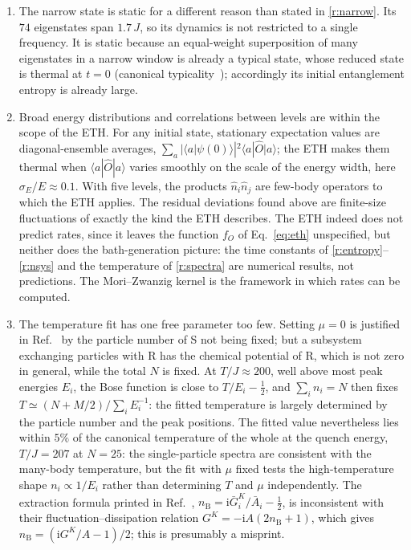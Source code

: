 \documentclass[10pt,a4paper]{article}
\newcommand{\ii}{\mathrm{i}}
\begin{document}
\begin{enumerate}[label=(\alph*), leftmargin=2.2em]
\item The narrow state is static for a different reason than stated in \ref{r:narrow}. Its $ 74 $ eigenstates span $ 1.7\,J $, so its dynamics is not restricted to a single frequency. It is static because an equal-weight superposition of many eigenstates in a narrow window is already a typical state, whose reduced state is thermal at $ t = 0 $ (canonical typicality~\cite{Goldstein2006,Popescu2006}); accordingly its initial entanglement entropy is already large.
\item Broad energy distributions and correlations between levels are within the scope of the ETH. For any initial state, stationary expectation values are diagonal-ensemble averages, $ \sum_a |\langle a|\psi(0)\rangle|^2 \langle a|\hat O|a\rangle $; the ETH makes them thermal when $ \langle a|\hat O|a\rangle $ varies smoothly on the scale of the energy width, here $ \sigma_E/E \approx 0.1 $. With five levels, the products $ \hat n_i \hat n_j $ are few-body operators to which the ETH applies. The residual deviations found above are finite-size fluctuations of exactly the kind the ETH describes. The ETH indeed does not predict rates, since it leaves the function $ f_O $ of Eq.~\eqref{eq:eth} unspecified, but neither does the bath-generation picture: the time constants of \ref{r:entropy}--\ref{r:nsys} and the temperature of \ref{r:spectra} are numerical results, not predictions. The Mori--Zwanzig kernel is the framework in which rates can be computed.
\item The temperature fit has one free parameter too few. Setting $ \mu = 0 $ is justified in Ref.~\cite{Lenk2025} by the particle number of S not being fixed; but a subsystem exchanging particles with R has the chemical potential of R, which is not zero in general, while the total $ N $ is fixed. At $ T/J \approx 200 $, well above most peak energies $ E_i $, the Bose function is close to $ T/E_i - \frac12 $, and $ \sum_i n_i = N $ then fixes $ T \simeq (N + M/2) / \sum_i E_i^{-1} $: the fitted temperature is largely determined by the particle number and the peak positions. The fitted value nevertheless lies within $ 5\% $ of the canonical temperature of the whole at the quench energy, $ T/J = 207 $ at $ N = 25 $: the single-particle spectra are consistent with the many-body temperature, but the fit with $ \mu $ fixed tests the high-temperature shape $ n_i \propto 1/E_i $ rather than determining $ T $ and $ \mu $ independently. The extraction formula printed in Ref.~\cite{Lenk2025}, $ n_{\mathrm B} = \ii \bar G^K_i/\bar A_i - \frac12 $, is inconsistent with their fluctuation--dissipation relation $ G^K = -\ii A (2 n_{\mathrm B} + 1) $, which gives $ n_{\mathrm B} = (\ii G^K/A - 1)/2 $; this is presumably a misprint.

\end{enumerate}
\end{document}

